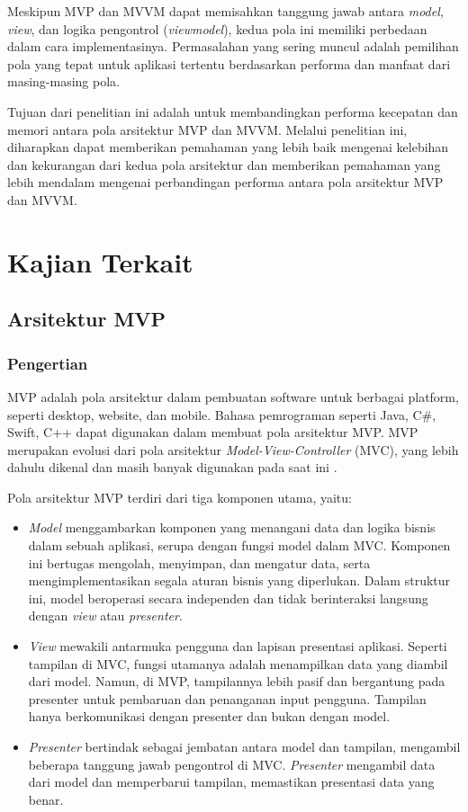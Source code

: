 \documentclass[conference]{IEEEtran}
\begin{document}
	Meskipun MVP dan MVVM dapat memisahkan tanggung jawab antara \textit{model, view}, dan logika pengontrol (\textit{viewmodel}), kedua pola ini memiliki perbedaan dalam cara implementasinya. Permasalahan yang sering muncul adalah pemilihan pola yang tepat untuk aplikasi tertentu berdasarkan performa dan manfaat dari masing-masing pola.
	
	Tujuan dari penelitian ini adalah untuk membandingkan performa kecepatan dan memori antara pola arsitektur MVP dan MVVM. Melalui penelitian ini, diharapkan dapat memberikan pemahaman yang lebih baik mengenai kelebihan dan kekurangan dari kedua pola arsitektur dan memberikan pemahaman yang lebih mendalam mengenai perbandingan performa antara pola arsitektur MVP dan MVVM.
	
	\section{Kajian Terkait}
	\subsection{Arsitektur MVP}
	\subsubsection{Pengertian}
	MVP adalah pola arsitektur dalam pembuatan software untuk berbagai platform, seperti desktop, website, dan mobile. Bahasa pemrograman seperti Java, C#, Swift, C++ dapat digunakan dalam membuat pola arsitektur MVP. MVP merupakan evolusi dari pola arsitektur \textit{Model-View-Controller} (MVC), yang lebih dahulu dikenal dan masih banyak digunakan pada saat ini \cite{Kom2022}. 
	
	Pola arsitektur MVP terdiri dari tiga komponen utama, yaitu:
	\begin{itemize}
		\item \textit{Model} menggambarkan komponen yang menangani data dan logika bisnis dalam sebuah aplikasi, serupa dengan fungsi model dalam MVC. Komponen ini bertugas mengolah, menyimpan, dan mengatur data, serta mengimplementasikan segala aturan bisnis yang diperlukan. Dalam struktur ini, model beroperasi secara independen dan tidak berinteraksi langsung dengan \textit{view} atau \textit{presenter}.
		\item \textit{View} mewakili antarmuka pengguna dan lapisan presentasi aplikasi. Seperti tampilan di MVC, fungsi utamanya adalah menampilkan data yang diambil dari model. Namun, di MVP, tampilannya lebih pasif dan bergantung pada presenter untuk pembaruan dan penanganan input pengguna. Tampilan hanya berkomunikasi dengan presenter dan bukan dengan model.
		\item \textit{Presenter} bertindak sebagai jembatan antara model dan tampilan, mengambil beberapa tanggung jawab pengontrol di MVC. \textit{Presenter} mengambil data dari model dan memperbarui tampilan, memastikan presentasi data yang benar. 
	\end{itemize}
	
\end{document}
